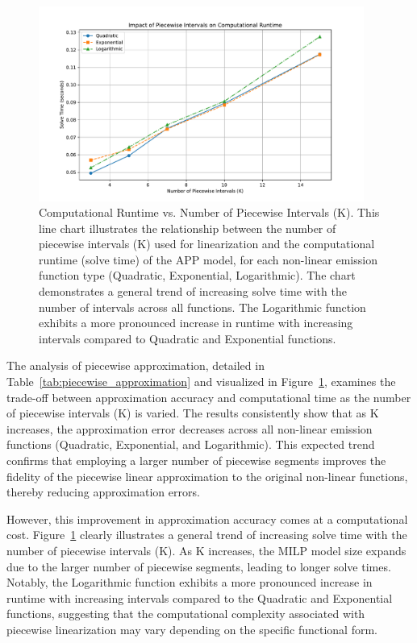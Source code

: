 \begin{table}[htbp]
\begin{table}[htbp]
\begin{table}[htbp]
\begin{table}[htbp]
\begin{table}[htbp]
\begin{figure}[htbp]
    \centering
    \includegraphics[width=0.95\textwidth]{images/runtime_vs_intervals.pdf}
    \caption{Computational Runtime vs. Number of Piecewise Intervals (K).
    This line chart illustrates the relationship between the number of piecewise intervals (K) used for linearization and the computational runtime (solve time) of the APP model, for each non-linear emission function type (Quadratic, Exponential, Logarithmic). The chart demonstrates a general trend of increasing solve time with the number of intervals across all functions. The Logarithmic function exhibits a more pronounced increase in runtime with increasing intervals compared to Quadratic and Exponential functions.}
    \label{fig:piecewise_approximation_runtime}
\end{figure}

The analysis of piecewise approximation, detailed in Table~\ref{tab:piecewise_approximation} and visualized in Figure~\ref{fig:piecewise_approximation_runtime}, examines the trade-off between approximation accuracy and computational time as the number of piecewise intervals (K) is varied.  The results consistently show that as K increases, the approximation error decreases across all non-linear emission functions (Quadratic, Exponential, and Logarithmic).  This expected trend confirms that employing a larger number of piecewise segments improves the fidelity of the piecewise linear approximation to the original non-linear functions, thereby reducing approximation errors.

However, this improvement in approximation accuracy comes at a computational cost.  Figure~\ref{fig:piecewise_approximation_runtime} clearly illustrates a general trend of increasing solve time with the number of piecewise intervals (K).  As K increases, the MILP model size expands due to the larger number of piecewise segments, leading to longer solve times.  Notably, the Logarithmic function exhibits a more pronounced increase in runtime with increasing intervals compared to the Quadratic and Exponential functions, suggesting that the computational complexity associated with piecewise linearization may vary depending on the specific functional form.


\end{table}
\end{table}
\end{table}
\end{table}
\end{table}
